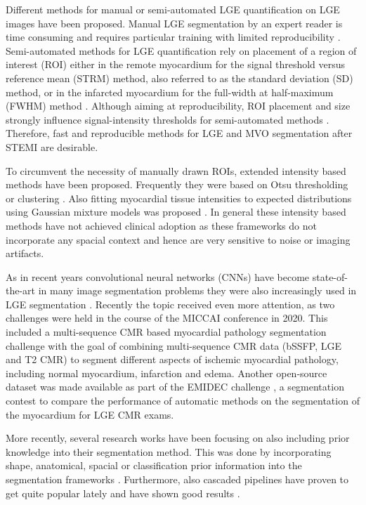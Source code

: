\documentclass[preprint,5p,authoryear]{elsarticle}
\begin{document}
Different methods for manual or semi-automated LGE quantification on LGE images have been 
proposed. Manual LGE segmentation by an expert reader is time consuming and requires particular 
training with limited reproducibility \citep{flett2011evaluation}. Semi-automated methods for LGE 
quantification rely on placement of a region of interest (ROI) either in the remote myocardium for the signal threshold versus reference mean (STRM) method, also referred to as the standard deviation (SD) method, or in the infarcted myocardium for the full-width at half-maximum (FWHM) method \citep{mcalindon2015quantification}. Although aiming at reproducibility, ROI placement and size strongly influence signal-intensity thresholds for semi-automated methods \citep{heiberg2022infarct}. Therefore, fast and reproducible methods for LGE and MVO segmentation after STEMI are desirable.

To circumvent the necessity of manually drawn ROIs, extended intensity based methods have been proposed. Frequently they were based on Otsu thresholding \citep{tao2010automated} or clustering \citep{detsky2009reproducible}. Also fitting myocardial tissue intensities to expected distributions using Gaussian mixture models was proposed \citep{engblom2016new, liu2017myocardium}. In general these intensity based methods have not achieved clinical adoption as these frameworks do not incorporate any spacial context and hence are very sensitive to noise or imaging artifacts.

As in recent years convolutional neural networks (CNNs) have become state-of-the-art in many image segmentation problems they were also increasingly used in LGE segmentation \citep{zabihollahy2018myocardial, moccia2019development,fahmy2020three}. Recently the topic received even more attention, as two challenges were held in the course of the MICCAI conference in 2020. This included a multi-sequence CMR based myocardial pathology segmentation challenge \citep{xiahai2020multi, li2023myops} with the goal of combining multi-sequence CMR data (bSSFP, LGE and T2 CMR) to segment different aspects of ischemic myocardial pathology, including normal myocardium, infarction and edema. Another open-source dataset was made available as part of the EMIDEC challenge \citep{eimdec_dataset, lalande2022deep}, a segmentation contest to compare the performance of automatic methods on the segmentation of the myocardium for LGE CMR exams. 

More recently, several research works have been focusing on also including prior knowledge into their segmentation method. This was done by incorporating shape, anatomical, spacial or classification prior information into the segmentation frameworks \citep{yue2019cardiac, zhou2021anatomy, brahim2022improved, popescu2022anatomically}. 
Furthermore, also cascaded pipelines have proven to get quite popular lately and have shown good results  \citep{zabihollahy2020fully, zhang2021cascaded, lustermans2022optimized}. 
\end{document}
